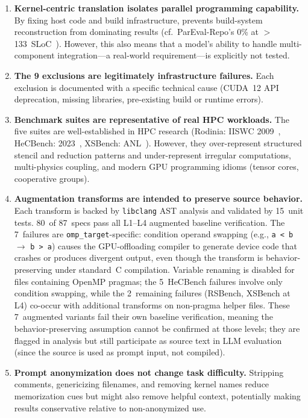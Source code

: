 \begin{enumerate}
      \item \textbf{Kernel-centric translation isolates parallel programming
    capability.} By fixing host code and build infrastructure, \parbench{}
    prevents build-system reconstruction from dominating results (cf.\
    ParEval-Repo's 0\% at $>$133~SLoC~\cite{ParEvalRepo2025}). However, this
    also means that a model's ability to handle multi-component integration---a
    real-world requirement---is explicitly not tested.

  \item \textbf{The 9 \knownfail{} exclusions are legitimately infrastructure
    failures.} Each exclusion is documented with a specific technical cause (CUDA~12 API deprecation, missing libraries, pre-existing build or runtime errors).

  \item \textbf{Benchmark suites are representative of real HPC workloads.}
    The five suites are well-established in HPC research (Rodinia: IISWC
    2009~\cite{Rodinia2009}, HeCBench: 2023~\cite{HeCBench2023}, XSBench:
    ANL~\cite{XSBench2014}). However, they over-represent structured stencil
    and reduction patterns and under-represent irregular computations,
    multi-physics coupling, and modern GPU programming idioms (tensor cores,
    cooperative groups).

    \item \textbf{Augmentation transforms are intended to preserve source behavior.} Each transform is backed by \texttt{libclang} AST analysis and validated by 15~unit tests. 80~of 87~specs pass all L1--L4 augmented baseline verification. The 7~failures are \texttt{omp\_target}-specific: condition operand swapping (e.g., \texttt{a < b} $\to$ \texttt{b > a}) causes the GPU-offloading compiler to generate device code that crashes or produces divergent output, even though the transform is behavior-preserving under standard~C compilation. Variable renaming is disabled for files containing OpenMP pragmas; the 5~HeCBench failures involve only condition swapping, while the 2~remaining failures (RSBench, XSBench at L4) co-occur with additional transforms on non-pragma helper files. These 7~augmented variants fail their own baseline verification, meaning the behavior-preserving assumption cannot be confirmed at those levels; they are flagged in analysis but still participate as source text in LLM evaluation (since the source is used as prompt input, not compiled).
    
    \item \textbf{Prompt anonymization does not change task difficulty.}
    Stripping comments, genericizing filenames, and removing kernel names reduce memorization cues but might also remove helpful context, potentially making \parbench{} results conservative relative to non-anonymized use.
\end{enumerate}

